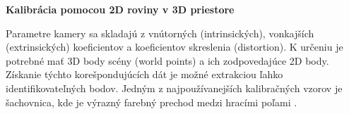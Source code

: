 \textbf{Kalibrácia pomocou 2D roviny v 3D priestore}


Parametre kamery sa skladajú z vnútorných (intrinsických), vonkajších (extrinsických) koeficientov a koeficientov skreslenia (distortion). K určeniu je potrebné mať 3D body scény (world points) a ich zodpovedajúce 2D body. Získanie týchto korešpondujúcích dát je možné extrakciou ľahko identifikovateľných bodov. Jedným z najpoužívanejších kalibračných vzorov je šachovnica, kde je výrazný farebný prechod medzi hracími poľami \cite{zhang2000flexible}.


%
%
%
